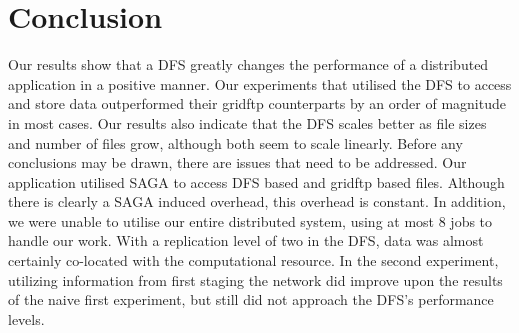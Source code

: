 \documentclass{rspublic}
\begin{document}
\section{Conclusion}
Our results show that a DFS greatly changes the performance of a
distributed application in a positive manner. Our experiments that
utilised the DFS to access and store data outperformed their gridftp
counterparts by an order of magnitude in most cases. Our results also
indicate that the DFS scales better as file sizes and number of files
grow, although both seem to scale linearly. Before any conclusions may
be drawn, there are issues that need to be addressed. Our application
utilised SAGA to access DFS based and gridftp based files. Although
there is clearly a SAGA induced overhead, this overhead is constant.
In addition, we were unable to utilise our entire distributed system,
using at most 8 jobs to handle our work. With a replication level of two
in the DFS, data was almost certainly co-located with the computational
resource. In the second experiment, utilizing information from first
staging the network did improve upon the results of the naive first
experiment, but still did not approach the DFS's performance levels.
\end{document}
